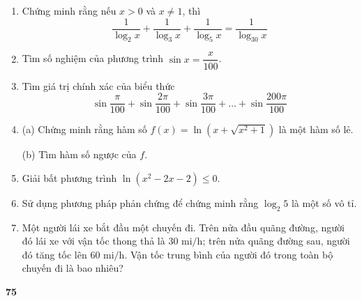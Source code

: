 \begin{minipage}[t]{0.73\textwidth}
\begin{enumerate}[label=\bfseries\arabic*., leftmargin=*, itemsep=3.2pt, topsep=0pt, parsep=0pt]
        \item Chứng minh rằng nếu $x > 0$ và $x \neq 1$, thì
        \[
            \frac{1}{\log_2 x} + \frac{1}{\log_3 x} + \frac{1}{\log_5 x} = \frac{1}{\log_{30} x}
        \]

        \item Tìm số nghiệm của phương trình $\sin x = \dfrac{x}{100}$.

        \item Tìm giá trị chính xác của biểu thức
        \[
            \sin \frac{\pi}{100} + \sin \frac{2\pi}{100} + \sin \frac{3\pi}{100} + \dots + \sin \frac{200\pi}{100}
        \]

        \item (a) Chứng minh rằng hàm số $f(x) = \ln(x + \sqrt{x^2 + 1})$ là một hàm số lẻ.
        \par\vspace{1.5pt}
        (b) Tìm hàm số ngược của $f$.

        \item Giải bất phương trình $\ln(x^2 - 2x - 2) \leqslant 0$.

        \item Sử dụng phương pháp phản chứng để chứng minh rằng $\log_2 5$ là một số vô tỉ.

        \item Một người lái xe bắt đầu một chuyến đi. Trên nửa đầu quãng đường, người đó lái xe với vận tốc thong thả là $30\text{ mi/h}$; trên nửa quãng đường sau, người đó tăng tốc lên $60\text{ mi/h}$. Vận tốc trung bình của người đó trong toàn bộ chuyến đi là bao nhiêu?
    \end{enumerate}
    \vspace{14pt}
    \par\hfill\textbf{\textsf{75}}
\end{minipage}